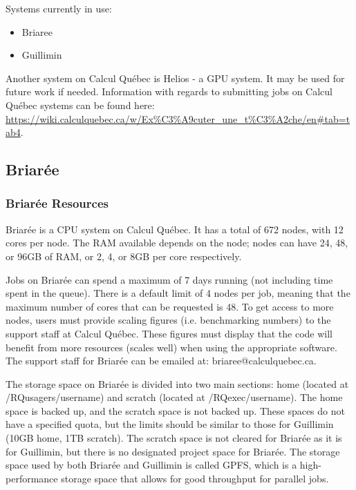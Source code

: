 \documentclass[12pt]{article}
\begin{document}
\quad Systems currently in use:
\begin{itemize}
\item Briaree
\item Guillimin
\end{itemize}
\quad\enskip\quad Another system on Calcul Qu\'{e}bec is Helios - a GPU system. It may be used for future work if needed. Information with regards to submitting jobs on Calcul Qu\'{e}bec systems can be found here: \url{https://wiki.calculquebec.ca/w/Ex%C3%A9cuter_une_t%C3%A2che/en#tab=tab4}. 


\subsection{Briar\'{e}e}

\subsubsection{Briar\'{e}e Resources}

\quad Briar\'{e}e is a CPU system on Calcul Qu\'{e}bec. It has a total of 672 nodes, with 12 cores per node. The RAM available depends on the node; nodes can have 24, 48, or 96GB of RAM, or 2, 4, or 8GB per core respectively.

\quad Jobs on Briar\'{e}e can spend a maximum of 7 days running (not including time spent in the queue). There is a default limit of 4 nodes per job, meaning that the maximum number of cores that can be requested is 48. To get access to more nodes, users must provide scaling figures (i.e. benchmarking numbers) to the support staff at Calcul Qu\'{e}bec. These figures must display that the code will benefit from more resources (scales well) when using the appropriate software. The support staff for Briar\'{e}e can be emailed at: briaree@calculquebec.ca.

\quad The storage space on Briar\'{e}e is divided into two main sections: home (located at /RQusagers/username) and scratch (located at /RQexec/username). The home space is backed up, and the scratch space is not backed up. These spaces do not have a specified quota, but the limits should be similar to those for Guillimin (10GB home, 1TB scratch). The scratch space is not cleared for Briar\'{e}e as it is for Guillimin, but there is no designated project space for Briar\'{e}e. The storage space used by both Briar\'{e}e and Guillimin is called GPFS, which is a high-performance storage space that allows for good throughput for parallel jobs.
\end{document}
